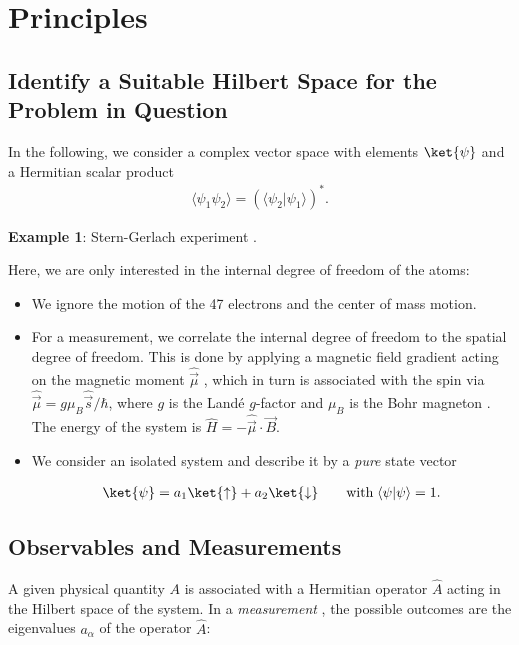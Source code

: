 \section{Principles}

\subsection{Identify a Suitable Hilbert Space for the Problem in Question}

In the following, we consider a complex vector space with elements $\ket{\psi}$ and a Hermitian scalar product
\begin{align}
				\langle\psi_1 \psi_2\rangle=(\langle{\psi_2}| \psi_1\rangle)^*.
\end{align}

\textbf{Example 1}: Stern-Gerlach experiment .

Here, we are only interested in the internal degree of freedom of the atoms:

\begin{itemize}
						\item 	We ignore the motion of the 47 electrons and the center of mass motion.
						\item 	For a measurement, we correlate the internal degree of freedom to the spatial degree of freedom. This is done by applying a magnetic field gradient acting on the magnetic moment $\hat{\vec{\mu}}$ , which in turn is associated with the spin via $\hat{\vec{\mu}} = g \mu_B \hat{\vec{s}}/\hbar$, where $g$ is the Landé $g$-factor  and $\mu_B$ is the Bohr magneton . The energy of the system is $\hat{H} = -\hat{\vec{\mu}} \cdot \vec{B}$.
						\item 	We consider an isolated system and describe it by a \emph{pure} state vector

\begin{align}
	\ket{\psi} = a_1 \ket{\uparrow} + a_2 \ket{\downarrow}  \qquad \text{with} \; \langle\psi | \psi\rangle = 1.
\end{align}
					
\end{itemize}

\subsection{Observables and Measurements}
			A given physical quantity $A$ is associated with a Hermitian operator $\hat{A}$  acting in the Hilbert space  of the system.
						In a \emph{measurement} , the possible outcomes are the eigenvalues $a_\alpha$  of the operator $\hat{A}$:

